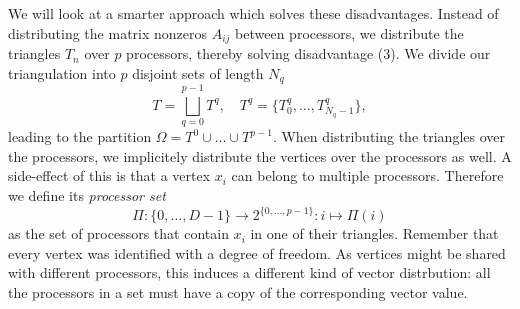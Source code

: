 \documentclass[11pt]{amsart}
\theoremstyle{definition}
\begin{document}
We will look at a smarter approach which solves these disadvantages. Instead of distributing the matrix nonzeros $A_{ij}$ between processors, we distribute the triangles $T_n$ over $p$ processors, thereby solving disadvantage (3). We divide our triangulation into $p$ disjoint sets of length $N_q$
\[
  T = \bigsqcup_{q=0}^{p-1} T^q, \quad T^q = \{ T^q_0, \ldots, T^q_{N_q-1} \},
\]
leading to the partition $\Omega = T^0 \cup \dots \cup T^{p-1}$. When distributing the triangles over the processors, we implicitely distribute the vertices over the processors as well.  A side-effect of this is that a vertex $x_i$ can belong to multiple processors. Therefore we define its \emph{processor set} 
\[
  \Pi: \{0, \ldots, D-1\} \to 2^{\{0, \ldots, p-1\}}: i \mapsto \Pi(i)
\]
as the set of processors that contain $x_i$ in one of their triangles. Remember that every vertex was identified with a degree of freedom. As vertices might be shared with different processors, this induces a different kind of vector distrbution: all the processors in a set must have a copy of the corresponding vector value.
\end{document}
